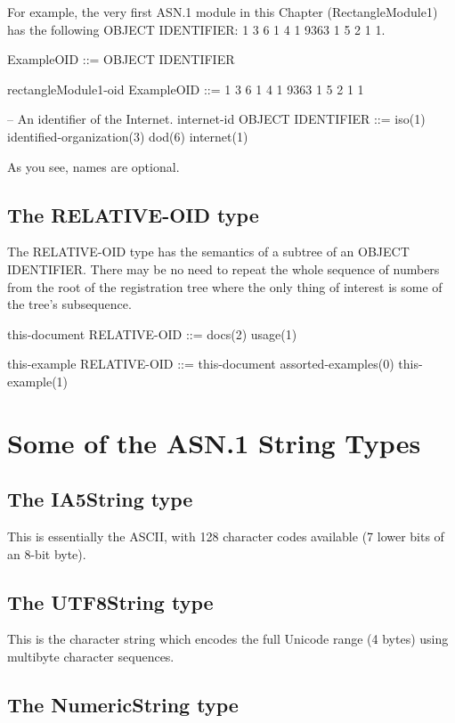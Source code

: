 \documentclass[english,oneside,12pt]{book}
\begin{document}
For example, the very first ASN.1 module in this Chapter (RectangleModule1)
has the following OBJECT IDENTIFIER: 1 3 6 1 4 1 9363 1 5 2 1 1.
\begin{asn}
ExampleOID ::= OBJECT IDENTIFIER

rectangleModule1-oid ExampleOID
  ::= { 1 3 6 1 4 1 9363 1 5 2 1 1 }

-- An identifier of the Internet.
internet-id OBJECT IDENTIFIER
  ::= { iso(1) identified-organization(3)
        dod(6) internet(1) }
\end{asn}
As you see, names are optional.


\subsection{The RELATIVE-OID type}

The RELATIVE-OID type has the semantics of a subtree of an OBJECT
IDENTIFIER. There may be no need to repeat the whole sequence of numbers
from the root of the registration tree where the only thing of interest
is some of the tree's subsequence.
\begin{asn}
this-document RELATIVE-OID ::= { docs(2) usage(1) }

this-example RELATIVE-OID ::= {
    this-document assorted-examples(0) this-example(1) }
\end{asn}

\section{Some of the ASN.1 String Types}


\subsection{The IA5String type}

This is essentially the ASCII, with 128 character codes available
(7 lower bits of an 8-bit byte).


\subsection{The UTF8String type}

This is the character string which encodes the full Unicode range
(4 bytes) using multibyte character sequences.


\subsection{The NumericString type}
\end{document}
